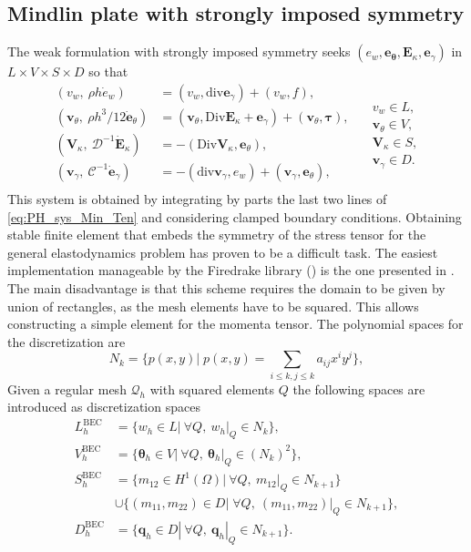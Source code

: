 \documentclass{ifacconf}
\begin{document}
\subsection{Mindlin plate with strongly imposed symmetry}

The weak formulation with strongly imposed symmetry seeks $(e_w, \bm{e}_{\bm{\theta}}, \bm{E}_{\kappa}, \bm{e}_{\gamma})$ in $L \times V \times S \times D$ so that 
\begin{equation}
\label{eq:weak_min_PH_strong}
\begin{aligned}
(v_w, \ \rho h \dot{e}_w) &= (v_w, \mathrm{div} \bm{e}_\gamma) + (v_w, f), \\ 
(\bm{v}_\theta, \ \rho h^3/12  \dot{\bm{e}}_\theta) &= (\bm{v}_\theta, \mathrm{Div} \bm{E}_\kappa + \bm{e}_\gamma) + (\bm{v}_\theta, \bm{\tau}), \\  
(\bm{V}_\kappa, \ \mathcal{D}^{-1} \dot{\bm{E}}_\kappa) &= -(\mathrm{Div} \bm{V}_\kappa,  \bm{e}_\theta), \\ 
(\bm{v}_\gamma, \ \mathcal{C}^{-1} \dot{\bm{e}}_\gamma) &= -(\mathrm{div} \bm{v}_\gamma, e_w ) + (\bm{v}_\gamma, \bm{e}_{\theta}), \\ 
\end{aligned} \quad
\begin{aligned}
v_w \in L, \\
\bm{v}_\theta \in V, \\
\bm{V}_\kappa \in S, \\
\bm{v}_\gamma \in D.
\end{aligned}
\end{equation}
This system is obtained by integrating by parts the last two lines of \eqref{eq:PH_sys_Min_Ten} and considering clamped boundary conditions. Obtaining stable finite element that embeds the symmetry of the stress tensor for the general elastodynamics problem has proven to be a difficult task. The easiest implementation manageable by the Firedrake library (\cite{rathgeber2017firedrake}) is the one presented in \cite{becacheWave,becacheElas}. The main disadvantage is that this scheme requires the domain to be given by union of rectangles, as the mesh elements have to be squared. This allows constructing a simple element for the momenta tensor. The polynomial spaces for the discretization are
\[
N_{k} = \{p(x, y)| \; p(x, y) = \sum_{i\le k, j\le k} a_{ij} x^i y^j  \},
\]
Given a regular mesh $\mathcal{Q}_h$ with squared elements $Q$ the following spaces are introduced as discretization spaces
\begin{equation*}
	\begin{aligned}
	L_h^{\text{BEC}} &= \{w_h \in L | \ \forall Q, \ w_h|_{Q} \in N_k \}, \\
	V_h^{\text{BEC}} &= \{\bm{\theta}_h \in V | \ \forall Q,\ \bm{\theta}_h|_{Q} \in (N_k)^2 \}, \\
	S_h^{\text{BEC}} &= \{m_{12} \in H^1(\Omega)| \ \forall Q,\ m_{12}|_{Q} \in N_{k+1} \}  \\
	&\cup \{(m_{11}, m_{22}) \in D| \; \forall Q,\ (m_{11}, m_{22})|_{Q} \in N_{k+1} \}, \\
	D_h^{\text{BEC}} &= \{\bm{q}_h \in D | \ \forall Q,\ \bm{q}_h|_{Q} \in N_{k+1} \}. \\ 
	\end{aligned}
\end{equation*}
\end{document}
